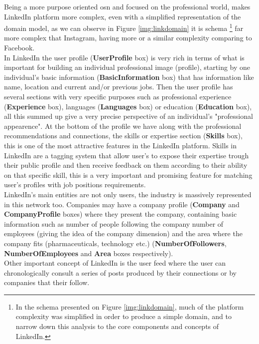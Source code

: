 \indent Being a more purpose oriented \gls{osn} and focused on the professional
world, makes LinkedIn platform more complex, even with a simplified representation of the domain model, as we can observe in Figure \ref{img:linkdomain} it is schema
\footnote{\indent In the schema presented on Figure \ref{img:linkdomain}, much of the platform complexity was simplified in order to produce a simple domain, and to narrow
down this analysis to the core components and concepts of LinkedIn.}
far more complex that Instagram, having more or a similar complexity comparing to Facebook.\\
\indent In LinkedIn the user profile (\textbf{UserProfile} box) is very rich in terms of what is important for building an individual professional image (profile),
starting by one individual's basic information (\textbf{BasicInformation} box) that has information like name, location and current and/or previous jobs. Then
the user profile has several sections with very specific purposes such as professional experience (\textbf{Experience} box), languages (\textbf{Languages} box) or
education (\textbf{Education} box), all this summed up give a very precise perspective of an individual's "professional appearence". At the bottom of the profile
we have along with the professional recommendations and connections, the skills or expertise section (\textbf{Skills} box), this is one of the most attractive features
in the LinkedIn platform. Skills in LinkedIn are a tagging system that allow user's to expose their expertise trough their public profile and then receive feedback
on them according to their ability on that specific skill, this is a very important and promising feature for matching user's profiles with
job positions requirements.\\
\indent LinkedIn's main entities are not only users, the industry is massively represented in this network too. Companies may have a company profile
(\textbf{Company} and \textbf{CompanyProfile} boxes) where they present the company, containing basic information such as number of people following the company
number of employees (giving the idea of the company dimension) and the area where the company fits (pharmaceuticals, technology etc.) (\textbf{NumberOfFollowers},
\textbf{NumberOfEmployees} and \textbf{Area} boxes respectively).\\
\indent Other important concept of LinkedIn is the user feed where the user can chronologically consult a series of posts produced by their connections
or by companies that their follow.

